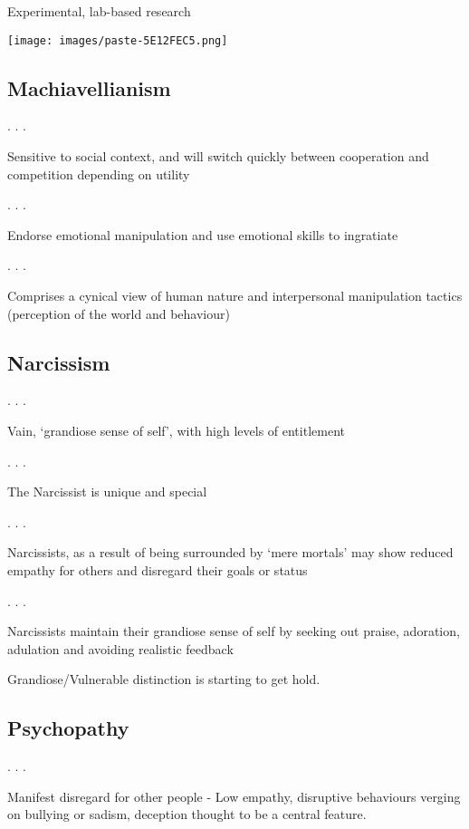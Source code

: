 \documentclass[
  letterpaper,
  DIV=11,
  numbers=noendperiod]{scrartcl}
\begin{document}
Experimental, lab-based research

\texttt{[image: images/paste-5E12FEC5.png]}

\hypertarget{machiavellianism}{%
\subsection{Machiavellianism}\label{machiavellianism}}

. . .

Sensitive to social context, and will switch quickly between cooperation
and competition depending on utility

. . .

\hfill\break
Endorse emotional manipulation and use emotional skills to ingratiate

. . .

\hfill\break
Comprises a cynical view of human nature and interpersonal manipulation
tactics (perception of the world and behaviour)

\hypertarget{narcissism}{%
\subsection{Narcissism}\label{narcissism}}

. . .

Vain, `grandiose sense of self', with high levels of entitlement

. . .

\hfill\break
The Narcissist is unique and special

. . .

\hfill\break
Narcissists, as a result of being surrounded by `mere mortals' may show
reduced empathy for others and disregard their goals or status

. . .

\hfill\break
Narcissists maintain their grandiose sense of self by seeking out
praise, adoration, adulation and avoiding realistic feedback

Grandiose/Vulnerable distinction is starting to get hold.

\hypertarget{psychopathy}{%
\subsection{Psychopathy}\label{psychopathy}}

. . .

Manifest disregard for other people - Low empathy, disruptive behaviours
verging on bullying or sadism, deception thought to be a central
feature.
\end{document}
